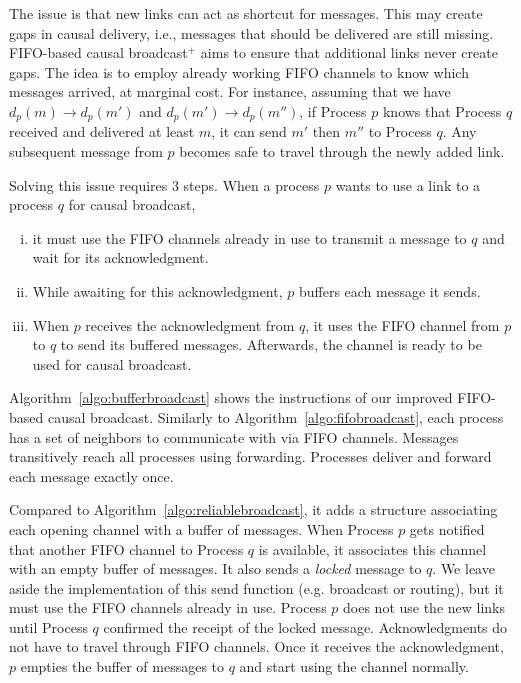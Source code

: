 The issue is that new links can act as shortcut for messages. This may create
gaps in causal delivery, i.e., messages that should be delivered are still
missing.  FIFO-based causal broadcast$^+$ aims to ensure that additional links
never create gaps. The idea is to employ already working FIFO channels to know
which messages arrived, at marginal cost. For instance, assuming that we have
$d_p(m) \rightarrow d_p(m')$ and $d_p(m') \rightarrow d_p(m'')$, if Process $p$
knows that Process $q$ received and delivered at least $m$, it can send $m'$
then $m''$ to Process $q$. Any subsequent message from $p$ becomes safe to
travel through the newly added link.



Solving this issue requires 3 steps. When a process $p$ wants to use a link to a
process $q$ for causal broadcast,
\begin{enumerate}[(i)]
\item it must use the FIFO channels already in use to transmit a message to $q$
  and wait for its acknowledgment.
\item While awaiting for this acknowledgment, $p$ buffers each message it
  sends.
\item When $p$ receives the acknowledgment from $q$, it uses the FIFO channel
  from $p$ to $q$ to send its buffered messages. Afterwards, the channel is
  ready to be used for causal broadcast.
\end{enumerate}

%   


Algorithm~\ref{algo:bufferbroadcast} shows the instructions of our improved
FIFO-based causal broadcast. Similarly to Algorithm~\ref{algo:fifobroadcast},
each process has a set of neighbors to communicate with via FIFO
channels. Messages transitively reach all processes using forwarding. Processes
deliver and forward each message exactly once.  

Compared to Algorithm~\ref{algo:reliablebroadcast}, it adds a structure associating
each opening channel with a buffer of messages. When Process $p$ gets notified
that another FIFO channel to Process $q$ is available, it associates this
channel with an empty buffer of messages. It also sends a \emph{locked} message
to $q$. We leave aside the implementation of this send function (e.g. broadcast
or routing), but it must use the FIFO channels already in use.  Process $p$ does
not use the new links until Process $q$ confirmed the receipt of the locked
message. Acknowledgments do not have to travel through FIFO channels.  Once it
receives the acknowledgment, $p$ empties the buffer of messages to $q$ and start
using the channel normally.


